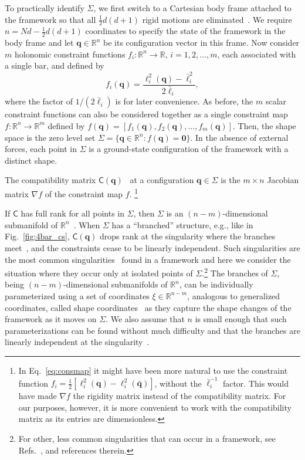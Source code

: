 To practically identify $\Sigma$, we first switch to a Cartesian body frame attached to the framework so that all $\frac{1}{2}d(d+1)$ rigid motions are eliminated~\cite{herschbach1959,echenique2011}.
We require $n = Nd - \frac{1}{2}d(d+1)$ coordinates to specify the state of the framework in the body frame and let $\bm{q} \in \mathbb{R}^{n}$ be its configuration vector in this frame.
Now consider $m$ holonomic constraint functions $f_i: \mathbb{R}^{n} \to \mathbb{R},\,i=1,2,\ldots,m$, each associated with a single bar, and defined by
%
\begin{equation}
  f_i(\bm{q}) = \frac{\ell_i^2(\bm{q}) - \bar{\ell}_i^2}{2\bar{\ell}_i},
  \label{eq:consmap}
\end{equation}
%
where the factor of $1/(2\bar{\ell}_i)$ is for later convenience.
As before, the $m$ scalar constraint functions can also be considered together as a single constraint map $f: \mathbb{R}^{n} \to \mathbb{R}^m$ defined by $f(\bm{q}) = [f_1(\bm{q}), f_2(\bm{q}), \ldots, f_m(\bm{q})]$.
Then, the shape space is the zero level set $\Sigma = \{\bm{q} \in \mathbb{R}^{n}: f(\bm{q}) = \bm{0}\}$.
In the absence of external forces, each point in $\Sigma$ is a ground-state configuration of the framework with a distinct shape.

The compatibility matrix $\mathsf{C}(\bm{q})$~\cite{pellegrino1986,lubensky2015} at a configuration $\bm{q} \in \Sigma$ is the $m \times n$ Jacobian matrix $\nabla f$ of the constraint map $f$.%
\footnote{In Eq.~\eqref{eq:consmap} it might have been more natural to use the constraint function $f_{i} = \frac{1}{2}[\ell_{i}^{2}(\bm{q}) - \ell_{i}^{2}(\bar{\bm{q}})]$, without the $\bar{\ell}_{i}^{-1}$ factor.  This would have made $\nabla f$ the rigidity matrix instead of the compatibility matrix.  For our purposes, however, it is more convenient to work with the compatibility matrix as its entries are dimensionless.}

If $\mathsf{C}$ has full rank for all points in $\Sigma$, then $\Sigma$ is an $(n - m)$-dimensional submanifold of $\mathbb{R}^{n}$~\cite{leimkuhler2005,lee2013}.
When $\Sigma$ has a ``branched'' structure, e.g., like in Fig.~\ref{fig:4bar_cs}, $\mathsf{C}(\bm{q})$ drops rank at the singularity where the branches meet~\cite{lopez-custodio2020,muller2019}, and the constraints cease to be linearly independent.
Such singularities are the most common singularities~\cite{lopez-custodio2019,lopez-custodio2020} found in a framework and here we consider the situation where they occur only at isolated points of $\Sigma$.\footnote{For other, less common singularities that can occur in a framework, see Refs.~\cite{lopez-custodio2020,muller2019,muller2017}, and references therein.}
The branches of $\Sigma$, being $(n-m)$-dimensional submanifolds of $\mathbb{R}^{n}$, can be individually parameterized using a set of coordinates $\xi \in \mathbb{R}^{n-m}$, analogous to generalized coordinates, called shape coordinates~\cite{littlejohn1995} as they capture the shape changes of the framework as it moves on $\Sigma$.
We also assume that $n$ is small enough that such parameterizations can be found without much difficulty and that
the branches are linearly independent at the singularity~\cite{lopez-custodio2020}.

